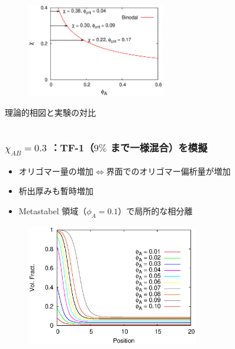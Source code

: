 \documentclass[12pt, dvipdfmx]{beamer}
\begin{document}
\begin{frame}
\begin{columns}
\begin{column}{6.0cm}
		\begin{figure}[htbp]
			\begin{center}
				\includegraphics[width=60mm]{PD_6_600_3.eps}
			\end{center}
		\end{figure}
		\begin{center}
			\vspace{-1\baselineskip}
			{\footnotesize 理論的相図と実験の対比}
		\end{center}
	\end{column}
\end{columns}

\end{frame}

\begin{frame}\frametitle{$\chi_{AB} = 0.3$ ：TF-1（$9\%$ まで一様混合）を模擬}

\begin{itemize}
	\item オリゴマー量の増加$\Leftrightarrow$界面でのオリゴマー偏析量が増加
	\item 析出厚みも暫時増加
	\item Metastabel 領域（$\phi_A = 0.1$）で局所的な相分離
\end{itemize}

\vspace{-0.5\baselineskip}
\begin{figure}[htbp]
	\begin{center}
		\includegraphics[width=75mm]{A6_B600_Chi_03_chiS_0.0_all.eps}
	\end{center}
\end{figure}
\end{frame}
\end{document}
